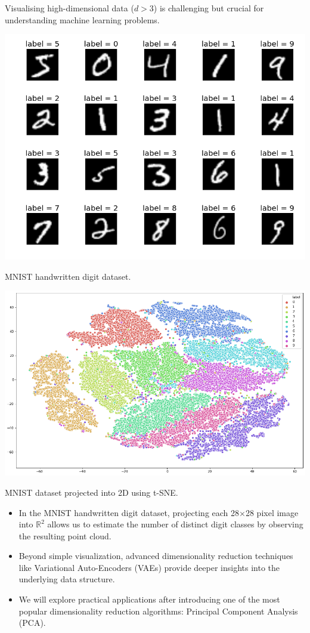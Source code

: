 Visualising high-dimensional data ($d > 3$) is challenging but crucial for understanding machine learning problems. 
\begin{marginfigure}
    \centering
    \includegraphics[width=1\linewidth]{img/2_mnist.png}
    \caption{MNIST handwritten digit dataset.}
    \label{fig:mnist_}
\end{marginfigure}
\begin{marginfigure}
    \centering
    \includegraphics[width=1\linewidth]{img/2_mnist-tsne.png}
    \caption{MNIST dataset projected into 2D using t-SNE.}
    \label{fig:mnist_tsne}
\end{marginfigure}
\begin{itemize}
    \item In the MNIST handwritten digit dataset, projecting each 28$\times$28 pixel image into $\mathbb{R}^2$ allows us to estimate the number of distinct digit classes by observing the resulting point cloud.
    \item Beyond simple visualization, advanced dimensionality reduction techniques like Variational Auto-Encoders (VAEs) provide deeper insights into the underlying data structure.
    \item We will explore practical applications after introducing one of the most popular dimensionality reduction algorithms: Principal Component Analysis (PCA).
\end{itemize}

